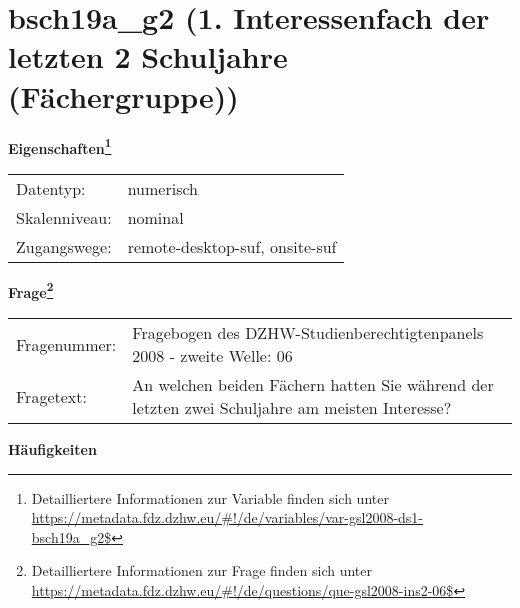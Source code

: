 
    \setcounter{footnote}{0}

    \vspace*{-1.8cm}
	\section{bsch19a\_g2 (1. Interessenfach der letzten 2 Schuljahre (Fächergruppe))}
	\label{section:bsch19a_g2}



    \vspace*{0.5cm}
    \noindent\textbf{Eigenschaften\footnote{Detailliertere Informationen zur Variable finden sich unter
		\url{https://metadata.fdz.dzhw.eu/\#!/de/variables/var-gsl2008-ds1-bsch19a_g2$}}}\\
	\begin{tabularx}{\hsize}{@{}lX}
	Datentyp: & numerisch \\
	Skalenniveau: & nominal \\
	Zugangswege: &
	  remote-desktop-suf, 
	  onsite-suf
 \\
    \end{tabularx}



				\vspace*{0.5cm}
                \noindent\textbf{Frage\footnote{Detailliertere Informationen zur Frage finden sich unter
		              \url{https://metadata.fdz.dzhw.eu/\#!/de/questions/que-gsl2008-ins2-06$}}}\\
				\begin{tabularx}{\hsize}{@{}lX}
					Fragenummer: &
					  Fragebogen des DZHW-Studienberechtigtenpanels 2008 - zweite Welle:
					  06
 \\
					Fragetext: & An welchen beiden Fächern hatten Sie während der letzten zwei Schuljahre am meisten Interesse? \\
				\end{tabularx}





        		\vspace*{0.5cm}
                \noindent\textbf{Häufigkeiten}


